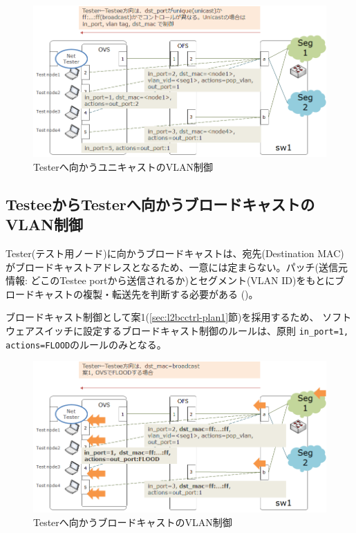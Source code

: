 \begin{figure}[h]
 \centering
 \includegraphics[scale=0.6]{img/vlan-testee2tester.png}
 \caption{Testerへ向かうユニキャストのVLAN制御}
 \label{fig:vlan-testee2tester}
\end{figure}

  \subsection{TesteeからTesterへ向かうブロードキャストのVLAN制御}
  \label{sec:vlan-ctrl-testee2tester-broadcast}

Tester(テスト用ノード)に向かうブロードキャストは、宛先(Destination MAC)
がブロードキャストアドレスとなるため、一意には定まらない。パッチ(送信元
情報: どこのTestee portから送信されるか)とセグメント(VLAN ID)をもとにブ
ロードキャストの複製・転送先を判断する必要がある
()。

ブロードキャスト制御として案1(\ref{sec:l2bcctrl-plan1}節)を採用するため、
ソフトウェアスイッチに設定するブロードキャスト制御のルールは、原則
\verb|in_port=1, actions=FLOOD|のルールのみとなる。
\begin{figure}[h]
 \centering
 \includegraphics[scale=0.6]{img/vlan-testee2tester-bcplan1.png}
 \caption{Testerへ向かうブロードキャストのVLAN制御}
 \label{fig:vlan-testee2tester-bcplan1}
\end{figure}


